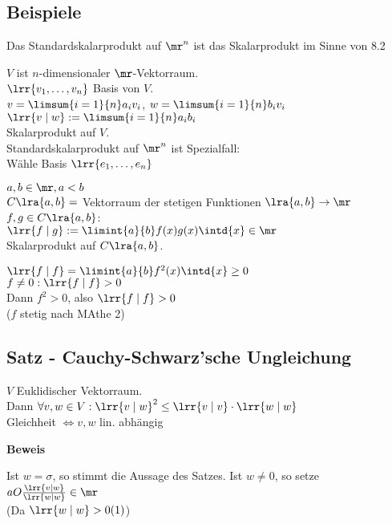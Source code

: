 \subsection{Beispiele}
		\item Das Standardskalarprodukt auf $\mr^n$ ist das Skalarprodukt im Sinne von 8.2
		\item $V$ ist $n$-dimensionaler $\mr$-Vektorraum.\\
			$\lrr{v_1,\dots,v_n}$ Basis von $V$.\\
			$v=\limsum{i=1}{n}a_iv_i$, $w=\limsum{i=1}{n}b_iv_i$\\
			$\lrr{v\mid w}:=\limsum{i=1}{n}a_ib_i$\\
			Skalarprodukt auf $V$.\\
			Standardskalarprodukt auf $\mr^n$ ist Spezialfall:\\
			Wähle Basis $\lrr{e_1,\dots,e_n}$
		\item $a,b\in\mr, a<b$\\
			$C\lra{a,b}=$ Vektorraum der stetigen Funktionen $\lra{a,b}\rightarrow\mr$\\
			$f,g\in C\lra{a,b}$:\\
			$\lrr{f\mid g}:=\limint{a}{b}f(x)g(x)\intd{x}\in\mr$\\
			Skalarprodukt auf $C\lra{a,b}$.\\
				\item $\lrr{f\mid f}=\limint{a}{b}f^2(x)\intd{x}\geq 0$\\
					$f\neq 0: \lrr{f\mid f}>0$\\
					Dann $f^2>0$, also $\lrr{f\mid f}> 0$\\
					($f$ stetig nach MAthe 2)
			\subExEnd
	\subExEnd

\subsection{Satz - Cauchy-Schwarz'sche Ungleichung}
	$V$ Euklidischer Vektorraum.\\
	Dann $\forall v,w\in V: \lrr{v\mid w}^2\leq\lrr{v\mid v}\cdot\lrr{w\mid w}$\\
	Gleichheit $\Leftrightarrow v,w$ lin. abhängig

	\textbf{Beweis}

	Ist $w=\sigma$, so stimmt die Aussage des Satzes. Ist $w\neq 0$, so setze $aO\frac{\lrr{v\mid w}}{\lrr{w\mid w}}\in\mr$\\
	(Da $\lrr{w\mid w}> 0 (1)$)

